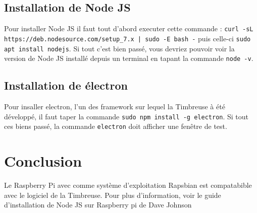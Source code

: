 \documentclass[10pt,a4paper,onecolumn]{article}
\begin{document}
\subsection{Installation de Node JS}
Pour installer Node JS il faut tout d'abord executer cette commande : \texttt{curl -sL https://deb.nodesource.com/setup\_7.x | sudo -E bash -} puis celle-ci
\texttt{sudo apt install nodejs}. Si tout c'est bien passé, vous devriez pouvoir voir la version de Node JS installé depuis un terminal en tapant la commande \texttt{node -v}.

\subsection{Installation de électron}
Pour insaller electron, l'un des framework sur lequel la Timbreuse à été développé, il faut taper la commande \texttt{sudo npm install -g electron}.
Si tout ces biens passé, la commande \texttt{electron} doit afficher une fenêtre de test.

\section{Conclusion}
Le Raspberry Pi avec comme système d'exploitation Rapsbian
est compatabible avec le logiciel de la Timbreuse. Pour plus d'information, voir le guide d'installation de Node JS sur Raspberry pi de Dave Johnson \cite{thisdavej}

\printbibliography
\end{document}
